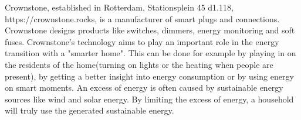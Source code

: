 Crownstone, established in Rotterdam, Stationsplein 45 d1.118, https://crownstone.rocks, is a manufacturer of smart plugs and connections. Crownstone designs products like switches, dimmers, energy monitoring and soft fuses. Crownstone's technology aims to play an important role in the energy transition with a "smarter home". This can be done for example by playing in on the residents of the home(turning on lights or the heating when people are present), by getting a better insight into energy consumption or by using energy on smart moments. An excess of energy is often caused by sustainable energy sources like wind and solar energy. By limiting the excess of energy, a household will truly use the generated sustainable energy.